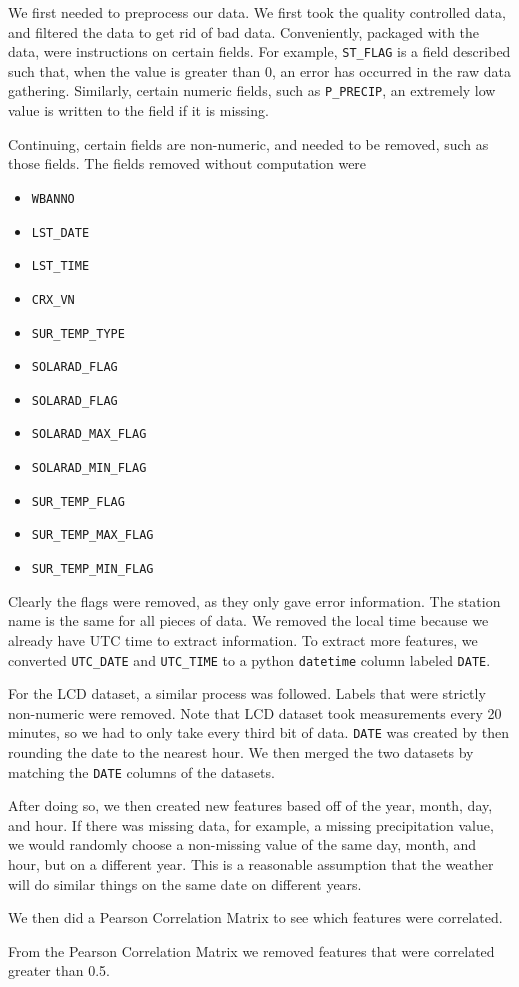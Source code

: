 \documentclass[../report.tex]{subfiles}
\begin{document}
We first needed to preprocess our data.
We first took the quality controlled data, and filtered the data to get rid of bad data.
Conveniently, packaged with the data, were instructions on certain fields.
For example, \verb|ST_FLAG| is a field described such that, when the value is greater than 0, an error has occurred in the raw data gathering.
Similarly, certain numeric fields, such as \verb|P_PRECIP|, an extremely low value is written to the field if it is missing.

Continuing, certain fields are non-numeric, and needed to be removed, such as those fields.
The fields removed without computation were

\begin{itemize}
    \item \verb|WBANNO|
    \item \verb|LST_DATE|
    \item \verb|LST_TIME|
    \item \verb|CRX_VN|
    \item \verb|SUR_TEMP_TYPE|
    \item \verb|SOLARAD_FLAG|
    \item \verb|SOLARAD_FLAG|
    \item \verb|SOLARAD_MAX_FLAG|
    \item \verb|SOLARAD_MIN_FLAG|
    \item \verb|SUR_TEMP_FLAG|
    \item \verb|SUR_TEMP_MAX_FLAG|
    \item \verb|SUR_TEMP_MIN_FLAG|
\end{itemize}
Clearly the flags were removed, as they only gave error information.
The station name is the same for all pieces of data.
We removed the local time because we already have UTC time to extract information.
To extract more features, we converted \verb|UTC_DATE| and \verb|UTC_TIME| to a python \verb|datetime| column labeled \verb|DATE|.

For the LCD dataset, a similar process was followed.
Labels that were strictly non-numeric were removed.
Note that LCD dataset took measurements every 20 minutes, so we had to only take every third bit of data.
\verb|DATE| was created by then rounding the date to the nearest hour.
We then merged the two datasets by matching the \verb|DATE| columns of the datasets.

After doing so, we then created new features based off of the year, month, day, and hour.
If there was missing data, for example, a missing precipitation value, we would randomly choose a non-missing value of the same day, month, and hour, but on a different year.
This is a reasonable assumption that the weather will do similar things on the same date on different years.

We then did a Pearson Correlation Matrix to see which features were correlated.
\begin{figure}
    \centering

    \label{fig:pearson_corr}
\end{figure}
From the Pearson Correlation Matrix we removed features that were correlated greater than 0.5.
\end{document}
